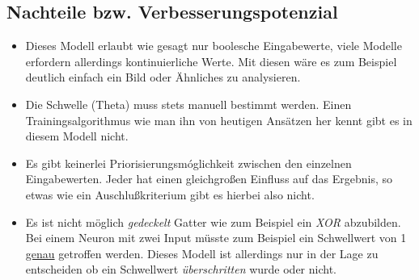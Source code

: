 \subsection{Nachteile bzw. Verbesserungspotenzial}

\begin{minipage}{\textwidth}
\begin{itemize}
\item Dieses Modell erlaubt wie gesagt nur boolesche Eingabewerte, viele Modelle erfordern allerdings kontinuierliche Werte. Mit diesen wäre es zum Beispiel deutlich einfach ein Bild oder Ähnliches zu analysieren.
\item Die Schwelle (Theta) muss stets manuell bestimmt werden. Einen Trainingsalgorithmus wie man ihn von heutigen Ansätzen her kennt gibt es in diesem Modell nicht. 
\item Es gibt keinerlei Priorisierungsmóglichkeit zwischen den einzelnen Eingabewerten. Jeder hat einen gleichgroßen Einfluss auf das Ergebnis, so etwas wie ein Auschlußkriterium gibt es hierbei also nicht. 
\item Es ist nicht möglich \emph{gedeckelt} Gatter wie zum Beispiel ein \emph{XOR} abzubilden. Bei einem Neuron mit zwei Input müsste zum Beispiel ein Schwellwert von 1 \underline{genau} getroffen werden. Dieses Modell ist allerdings nur in der Lage zu entscheiden ob ein Schwellwert \emph{überschritten} wurde oder nicht. 
\end{itemize}
\end{minipage}

